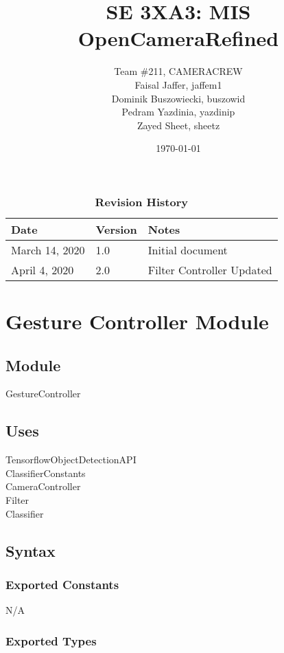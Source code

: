 \documentclass[12pt, titlepage]{article}
\title{SE 3XA3: MIS\\OpenCameraRefined}
\author{Team \#211, CAMERACREW
		\\ Faisal Jaffer, jaffem1
		\\ Dominik Buszowiecki, buszowid
		\\ Pedram Yazdinia, yazdinip
		\\ Zayed Sheet, sheetz
}
\date{\today}
\begin{document}
\maketitle


\begin{table}[hp]
\caption{\bf Revision History}
\begin{tabularx}{\textwidth}{p{3cm}p{2cm}X}
\toprule {\bf Date} & {\bf Version} & {\bf Notes}\\
\midrule
March 14, 2020 & 1.0 & Initial document\\
\midrule
April 4, 2020 & 2.0 & Filter Controller Updated\\
\bottomrule
\end{tabularx}
\end{table}

\newpage

\section* {Gesture Controller Module}

\subsection*{Module}

GestureController

\subsection* {Uses}

TensorflowObjectDetectionAPI \\
ClassifierConstants \\
CameraController \\
Filter \\
Classifier

\subsection* {Syntax}

\subsubsection* {Exported Constants}

N/A

\subsubsection* {Exported Types}
\end{document}
